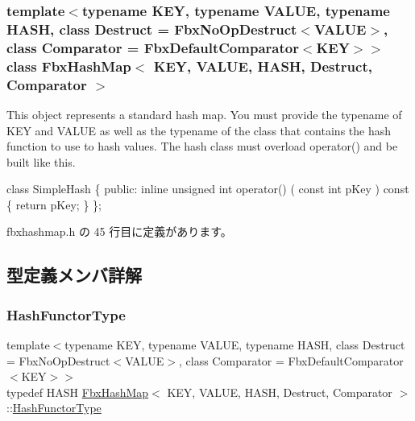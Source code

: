 \subsubsection*{template$<$typename K\+EY, typename V\+A\+L\+UE, typename H\+A\+SH, class Destruct = Fbx\+No\+Op\+Destruct$<$\+V\+A\+L\+U\+E$>$, class Comparator = Fbx\+Default\+Comparator$<$\+K\+E\+Y$>$$>$\newline
class Fbx\+Hash\+Map$<$ K\+E\+Y, V\+A\+L\+U\+E, H\+A\+S\+H, Destruct, Comparator $>$}

This object represents a standard hash map. You must provide the typename of K\+EY and V\+A\+L\+UE as well as the typename of the class that contains the hash function to use to hash values. The hash class must overload operator() and be built like this. 


\begin{DoxyCode}
\textcolor{keyword}{class }SimpleHash
\{
\textcolor{keyword}{public}:
    \textcolor{keyword}{inline} \textcolor{keywordtype}{unsigned} \textcolor{keywordtype}{int} operator() ( \textcolor{keyword}{const} \textcolor{keywordtype}{int} pKey )\textcolor{keyword}{ const}
\textcolor{keyword}{    }\{
        \textcolor{keywordflow}{return} pKey;
    \}
\};
\end{DoxyCode}
 

 fbxhashmap.\+h の 45 行目に定義があります。



\subsection{型定義メンバ詳解}
\mbox{\label{class_fbx_hash_map_a254381e9c4bde567aaf9d7286d753bd7}} 
\subsubsection{\texorpdfstring{Hash\+Functor\+Type}{HashFunctorType}}
{\footnotesize\ttfamily template$<$typename K\+EY, typename V\+A\+L\+UE, typename H\+A\+SH, class Destruct = Fbx\+No\+Op\+Destruct$<$\+V\+A\+L\+U\+E$>$, class Comparator = Fbx\+Default\+Comparator$<$\+K\+E\+Y$>$$>$ \\
typedef H\+A\+SH \hyperlink{class_fbx_hash_map}{Fbx\+Hash\+Map}$<$ K\+EY, V\+A\+L\+UE, H\+A\+SH, Destruct, Comparator $>$\+::\hyperlink{class_fbx_hash_map_a254381e9c4bde567aaf9d7286d753bd7}{Hash\+Functor\+Type}}




